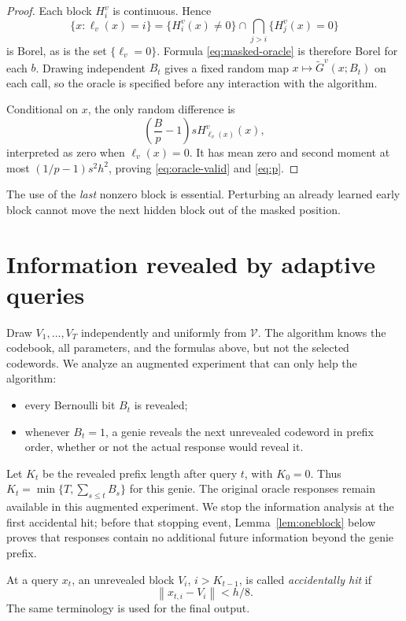 \documentclass[11pt,a4paper]{article}
\newcommand{\norm}[1]{\left\lVert #1\right\rVert}
\newcommand{\cV}{\mathcal V}
\theoremstyle{definition}
\theoremstyle{remark}
\begin{document}
\begin{proof}
Each block $H_i^v$ is continuous.  Hence
\[
 \{x:\ell_v(x)=i\}
 =\{H_i^v(x)\ne0\}\cap\bigcap_{j>i}\{H_j^v(x)=0\}
\]
is Borel, as is the set $\{\ell_v=0\}$.  Formula \eqref{eq:masked-oracle} is therefore Borel for each $b$.  Drawing independent $B_t$ gives a fixed random map $x\mapsto\widetilde G^v(x;B_t)$ on each call, so the oracle is specified before any interaction with the algorithm.

Conditional on $x$, the only random difference is
\[
 \left(\frac Bp-1\right)sH_{\ell_v(x)}^v(x),
\]
interpreted as zero when $\ell_v(x)=0$.  It has mean zero and second moment at most $(1/p-1)s^2h^2$, proving \eqref{eq:oracle-valid} and \eqref{eq:p}.
\end{proof}

The use of the \emph{last} nonzero block is essential.  Perturbing an already learned early block cannot move the next hidden block out of the masked position.

\section{Information revealed by adaptive queries}\label{sec:information}

Draw $V_1,\ldots,V_T$ independently and uniformly from $\cV$.  The algorithm knows the codebook, all parameters, and the formulas above, but not the selected codewords.  We analyze an augmented experiment that can only help the algorithm:
\begin{itemize}
\item every Bernoulli bit $B_t$ is revealed;
\item whenever $B_t=1$, a genie reveals the next unrevealed codeword in prefix order, whether or not the actual response would reveal it.
\end{itemize}
Let $K_t$ be the revealed prefix length after query $t$, with $K_0=0$. Thus $K_t=\min\{T,\sum_{s\le t}B_s\}$ for this genie. The original oracle responses remain available in this augmented experiment. We stop the information analysis at the first accidental hit; before that stopping event, Lemma~\ref{lem:oneblock} below proves that responses contain no additional future information beyond the genie prefix.

At a query $x_t$, an unrevealed block $V_i$, $i>K_{t-1}$, is called \emph{accidentally hit} if
\begin{equation}
 \norm{x_{t,i}-V_i}<h/8.
 \label{eq:hit}
\end{equation}
The same terminology is used for the final output.
\end{document}
